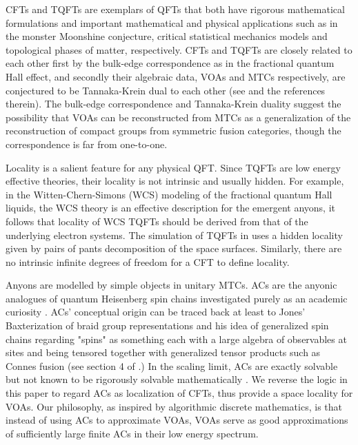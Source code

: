 \documentclass[twoside,11pt,titlepage]{amsart}
\renewcommand{\=}[1]{\stackrel{#1}{=}} %
\theoremstyle{definition}
\theoremstyle{remark}
\begin{document}
CFTs and TQFTs are exemplars of QFTs that both have rigorous mathematical formulations and important mathematical and physical applications such as in the monster Moonshine conjecture, critical statistical mechanics models and topological phases of matter, respectively.  CFTs and TQFTs are closely related to each other first by the bulk-edge correspondence as in the fractional quantum Hall effect, and secondly their algebraic data, VOAs and MTCs respectively, are conjectured to be Tannaka-Krein dual to each other (see \cite{tener16} and the references therein).  The bulk-edge correspondence and Tannaka-Krein duality suggest the possibility that VOAs can be reconstructed from MTCs as a generalization of the reconstruction of compact groups from symmetric fusion categories, though the correspondence is far from one-to-one. 

Locality is a salient feature for any physical QFT.  Since TQFTs are low energy effective theories, their locality is not intrinsic and usually hidden.  For example, in the Witten-Chern-Simons (WCS) modeling of the fractional quantum Hall liquids, the WCS theory is an effective description for the emergent anyons, it follows that locality of WCS TQFTs should be derived from that of the underlying electron systems.  The simulation of TQFTs in \cite{simulation02} uses a hidden locality given by pairs of pants decomposition of the space surfaces.  Similarly, there are no intrinsic infinite degrees of freedom for a CFT to define locality.  

Anyons are modelled by simple objects in unitary MTCs.  
ACs are the anyonic analogues of quantum Heisenberg spin chains investigated purely as an academic curiosity \cite{feiguin2007interacting}.  ACs' conceptual origin can be traced back at least to Jones' Baxterization of braid group representations and his idea of generalized spin chains regarding "spins" as something each with a large algebra of observables at sites and being tensored together with generalized tensor products such as Connes fusion (see section 4 of \cite{jones03}.)   In the scaling limit, ACs are exactly solvable but not known to be rigorously solvable mathematically \cite{feiguin2007interacting,saleur90}.  We reverse the logic in this paper to regard ACs as localization of CFTs, thus provide a space locality for VOAs.  Our philosophy, as inspired by algorithmic discrete mathematics, is that instead of using ACs to approximate VOAs, VOAs serve as good approximations of sufficiently large finite ACs in their low energy spectrum.
\end{document}
